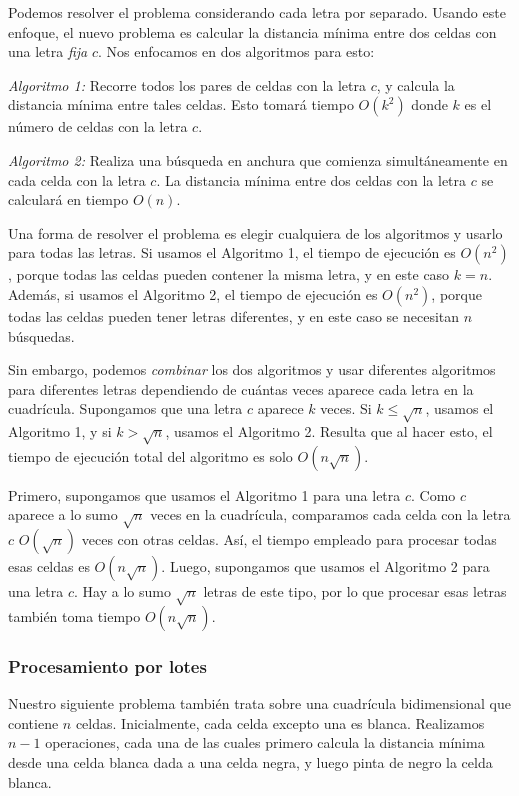 Podemos resolver el problema considerando cada letra por separado.
Usando este enfoque, el nuevo problema es calcular
la distancia mínima
entre dos celdas con una letra \emph{fija} $c$.
Nos enfocamos en dos algoritmos para esto:

\emph{Algoritmo 1:} Recorre todos los pares de celdas con la letra $c$,
y calcula la distancia mínima entre tales celdas.
Esto tomará tiempo $O(k^2)$ donde $k$ es el número de celdas con la letra $c$.

\emph{Algoritmo 2:} Realiza una búsqueda en anchura que comienza
simultáneamente en cada celda con la letra $c$. La distancia mínima entre
dos celdas con la letra $c$ se calculará en tiempo $O(n)$.

Una forma de resolver el problema es elegir cualquiera de los
algoritmos y usarlo para todas las letras.
Si usamos el Algoritmo 1, el tiempo de ejecución es $O(n^2)$,
porque todas las celdas pueden contener la misma letra,
y en este caso $k=n$.
Además, si usamos el Algoritmo 2, el tiempo de ejecución es $O(n^2)$,
porque todas las celdas pueden tener letras diferentes,
y en este caso se necesitan $n$ búsquedas.

Sin embargo, podemos \emph{combinar} los dos algoritmos y
usar diferentes algoritmos para diferentes letras
dependiendo de cuántas veces aparece cada letra en la cuadrícula.
Supongamos que una letra $c$ aparece $k$ veces.
Si $k \le \sqrt n$, usamos el Algoritmo 1, y si $k > \sqrt n$,
usamos el Algoritmo 2.
Resulta que al hacer esto, el tiempo de ejecución total
del algoritmo es solo $O(n \sqrt n)$.

Primero, supongamos que usamos el Algoritmo 1 para una letra $c$.
Como $c$ aparece a lo sumo $\sqrt n$ veces en la cuadrícula,
comparamos cada celda con la letra $c$ $O(\sqrt n)$ veces
con otras celdas.
Así, el tiempo empleado para procesar todas esas celdas es $O(n \sqrt n)$.
Luego, supongamos que usamos el Algoritmo 2 para una letra $c$.
Hay a lo sumo $\sqrt n$ letras de este tipo,
por lo que procesar esas letras también toma tiempo $O(n \sqrt n)$.

\subsubsection{Procesamiento por lotes}

Nuestro siguiente problema también trata sobre
una cuadrícula bidimensional que contiene $n$ celdas.
Inicialmente, cada celda excepto una es blanca.
Realizamos $n-1$ operaciones, cada una de las cuales primero
calcula la distancia mínima desde una celda blanca dada
a una celda negra, y luego pinta de negro la celda blanca.

